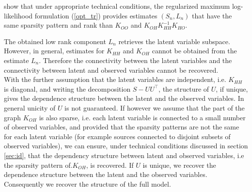 \documentclass[letterpaper]{article}
\begin{document}
\citet{chandrasekaran2010} show that under appropriate technical conditions, the regularized maximum log-likelihood formulation (\ref{opt_tr}) provides estimates $(S_{n},L_{n})$ that have the same sparsity pattern and rank than $K_{OO}$ and $K_{OH}K_{HH}^{-1}K_{HO}$. 

%
%



The obtained low rank component $L_{n}$ retrieves the latent variable subspace. However, in general, estimates for $K_{HH}$ and  $K_{OH}$ cannot be obtained from the estimate $L_{n}$. Therefore the connectivity between the latent variables and the connectivity between latent and observed variables cannot be recovered.\\



With the further assumption that the latent variables are independent,  i.e. $K_{HH}$ is  diagonal,  and writing the decomposition $S-UU^{\top}$, the structure of $U$, if unique,   gives the dependence structure  between the latent and the observed variables. In general unicity of $U$ is not guaranteed. If however we assume that the part of the graph $K_{OH}$ is also sparse, i.e. each latent variable is connected to a small number of observed variables, and provided that the sparsity patterns are not the same for each latent variable (for example sources connected to disjoint subsets of observed variables), we can ensure, under technical conditions discussed in section \ref{sec:id}, that the dependency structure between latent and observed variables, i.e the sparsity pattern of.$K_{OH}$, is recovered. If $U$ is unique, we recover the dependence structure  between the latent and the observed variables. Consequently we recover the structure of the full model.
\end{document}
